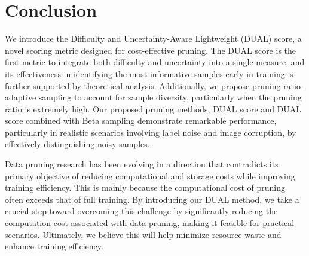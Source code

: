 \section{Conclusion}
We introduce the Difficulty and Uncertainty-Aware Lightweight (DUAL) score, a novel scoring metric designed for cost-effective pruning. The DUAL score is the first metric to integrate both difficulty and uncertainty into a single measure, and its effectiveness in identifying the most informative samples early in training is further supported by theoretical analysis. Additionally, we propose pruning-ratio-adaptive sampling to account for sample diversity, particularly when the pruning ratio is extremely high. Our proposed pruning methods, DUAL score and DUAL score combined with Beta sampling demonstrate remarkable performance, particularly in realistic scenarios involving label noise and image corruption, by effectively distinguishing noisy samples.

Data pruning research has been evolving in a direction that contradicts its primary objective of reducing computational and storage costs while improving training efficiency. This is mainly because the computational cost of pruning often exceeds that of full training. By introducing our DUAL method, we take a crucial step toward overcoming this challenge by significantly reducing the computation cost associated with data pruning, making it feasible for practical scenarios. Ultimately, we believe this will help minimize resource waste and enhance training efficiency.